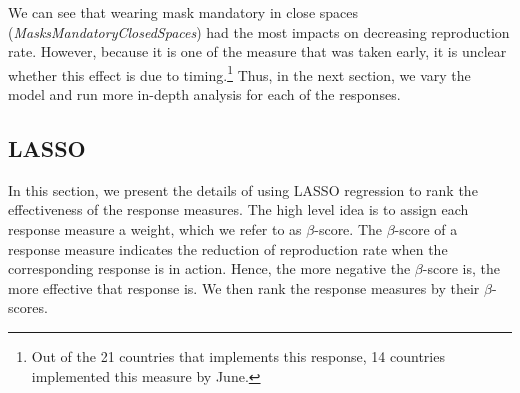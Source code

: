\documentclass[11pt]{article}
\begin{document}
We can see that wearing mask mandatory in close spaces (\textit{MasksMandatoryClosedSpaces}) had the most impacts on decreasing reproduction rate. However, because it is one of the measure that was taken early, it is unclear whether this effect is due to timing.\footnote{Out of the 21 countries that implements this response, 14 countries implemented this measure by June.} Thus, in the next section, we vary the model and run more in-depth analysis for each of the responses.
\subsection{LASSO}
In this section, we present the details of using LASSO regression to rank the effectiveness of the response measures. The high level idea is to assign each response measure a weight, which we refer to as $\beta$-score. The $\beta$-score of a response measure indicates the reduction of reproduction rate when the corresponding response is in action. Hence, the more negative the $\beta$-score is, the more effective that response is. We then rank the response measures by their $\beta$-scores.    
\end{document}
